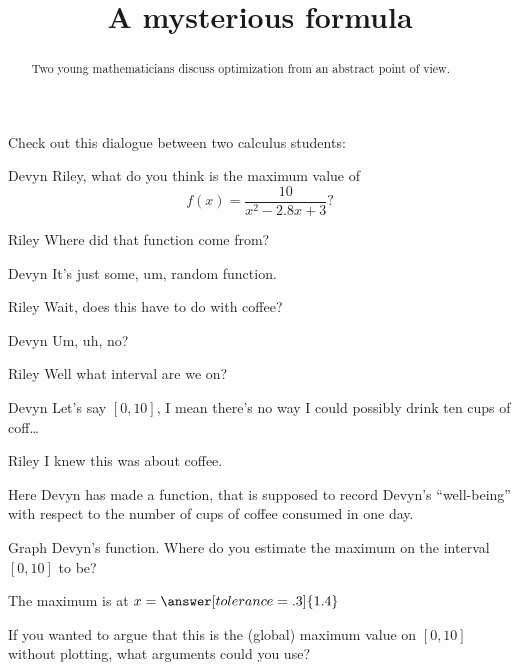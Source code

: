 \documentclass{ximera}
\title[Break-Ground:]{A mysterious formula}
\begin{document}
\begin{abstract}
Two young mathematicians discuss optimization from an abstract point
of view.
\end{abstract}
\maketitle

Check out this dialogue between two calculus students:

\begin{dialogue}
\item[Devyn] Riley, what do you think is the maximum value of
  \[
  f(x) = \frac{10}{x^2-2.8x+3}?
  \]
\item[Riley] Where did that function come from?
\item[Devyn] It's just some, um, random function.
\item[Riley] Wait, does this have to do with coffee?
\item[Devyn] Um, uh, no?
\item[Riley] Well what interval are we on?
\item[Devyn] Let's say $[0,10]$, I mean there's no way I could possibly drink ten cups of coff\dots
\item[Riley] I knew this was about coffee.
\end{dialogue}

Here Devyn has made a function, that is supposed to record Devyn's
``well-being'' with respect to the number of cups of coffee consumed
in one day.

\begin{problem}
  Graph Devyn's function. Where do you estimate the maximum on the
  interval $[0,10]$ to be?
  \begin{prompt}
    The maximum is at $x=\answer[tolerance=.3]{1.4}$
  \end{prompt}
\end{problem}

\begin{problem}
  If you wanted to argue that this is the (global) maximum value on
  $[0,10]$ without plotting, what arguments could you use?
  \begin{freeResponse}
  \end{freeResponse}
 \end{problem}

%
\end{document}
